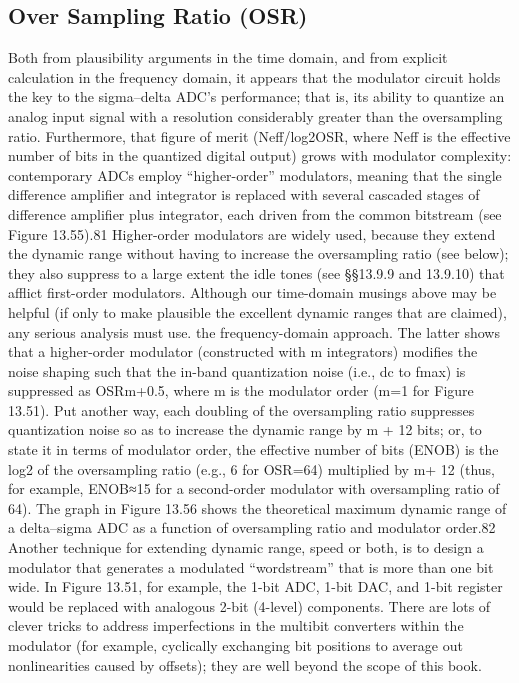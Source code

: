       \subsection{Over Sampling Ratio (OSR)}
      Both from plausibility arguments in the time domain, and from explicit calculation in the frequency domain, it appears that the modulator circuit holds the key to the sigma–delta ADC’s performance; that is, its ability to quantize an
analog input signal with a resolution considerably greater than the oversampling ratio. Furthermore, that figure of merit (Neff/log2OSR, where Neff is the effective number of bits in the quantized digital output) grows with modulator complexity: contemporary ADCs employ “higher-order” modulators, meaning that the single difference amplifier and integrator is replaced with several cascaded stages of difference amplifier plus integrator, each driven from the common bitstream (see Figure 13.55).81 Higher-order modulators are widely used, because they extend the dynamic range without having to increase the oversampling ratio (see below); they also suppress to a large extent the idle tones (see §§13.9.9 and 13.9.10) that afflict first-order modulators. Although our time-domain musings above may be helpful (if only to make plausible the excellent dynamic ranges that are claimed), any serious analysis must use.
the frequency-domain approach. The latter shows that a higher-order modulator (constructed with m integrators) modifies the noise shaping such that the in-band quantization noise (i.e., dc to fmax) is suppressed as OSRm+0.5, where m is the modulator order (m=1 for Figure 13.51). Put another way, each doubling of the oversampling ratio suppresses quantization noise so as to increase the dynamic range by m + 12 bits; or, to state it in terms of modulator order, the effective number of bits (ENOB) is the log2 of the oversampling ratio (e.g., 6 for OSR=64) multiplied by m+ 12 (thus, for example, ENOB≈15 for a second-order modulator with oversampling ratio of 64). The graph in Figure 13.56 shows the theoretical maximum dynamic range of a delta–sigma ADC as a function of oversampling ratio and modulator order.82 Another technique for extending dynamic range, speed or both, is to design a modulator that generates a modulated “wordstream” that is more than one bit wide. In Figure 13.51, for example, the 1-bit ADC, 1-bit DAC, and 1-bit register would be replaced with analogous 2-bit (4-level) components. There are lots of clever tricks to address imperfections in the multibit converters within the modulator (for example, cyclically exchanging bit positions to average out nonlinearities caused by offsets); they are well beyond the scope of this book.
